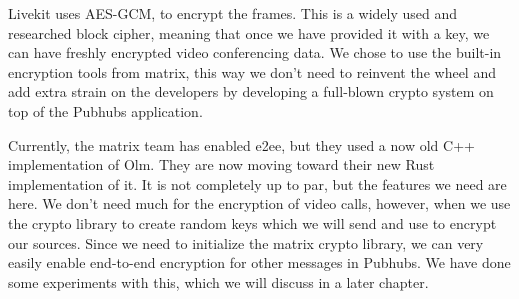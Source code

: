 \documentclass{report}
\begin{document}
    Livekit uses AES-GCM, to encrypt the frames. This is a widely used and researched block cipher, meaning that once we
    have provided it with a key, we can have freshly encrypted video conferencing data. We chose to use the built-in
    encryption tools from matrix, this way we don't need to reinvent the wheel and add extra strain on the developers by
    developing a full-blown crypto system on top of the Pubhubs application.

    Currently, the matrix team has enabled e2ee, but they used a now old C++ implementation of Olm. They are now moving
    toward their new Rust implementation of it. It is not completely up to par, but the features we need are here. We
    don't need much for the encryption of video calls, however, when we use the crypto library to create random keys
    which we will send and use to encrypt our sources. Since we need to initialize the matrix crypto library, we can
    very easily enable end-to-end encryption for other messages in Pubhubs. We have done some experiments with this,
    which we will discuss in a later chapter.





\end{document}
